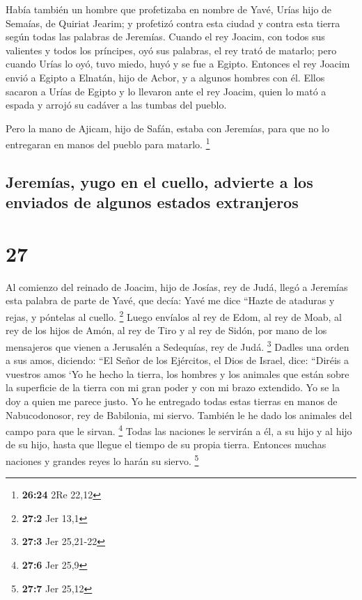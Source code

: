  Había también un hombre que profetizaba en nombre de
Yavé, Urías hijo de Semaías, de Quiriat Jearim; y profetizó contra esta
ciudad y contra esta tierra según todas las palabras de Jeremías.
 Cuando el rey Joacim, con todos sus valientes y todos
los príncipes, oyó sus palabras, el rey trató de matarlo; pero cuando
Urías lo oyó, tuvo miedo, huyó y se fue a Egipto. 
Entonces el rey Joacim envió a Egipto a Elnatán, hijo de Acbor, y a
algunos hombres con él.  Ellos sacaron a Urías de Egipto
y lo llevaron ante el rey Joacim, quien lo mató a espada y arrojó su
cadáver a las tumbas del pueblo.

 Pero la mano de Ajicam, hijo de Safán, estaba con
Jeremías, para que no lo entregaran en manos del pueblo para matarlo.
\footnote{\textbf{26:24} 2Re 22,12}

\hypertarget{jeremuxedas-yugo-en-el-cuello-advierte-a-los-enviados-de-algunos-estados-extranjeros}{%
\subsection{Jeremías, yugo en el cuello, advierte a los enviados de
algunos estados
extranjeros}\label{jeremuxedas-yugo-en-el-cuello-advierte-a-los-enviados-de-algunos-estados-extranjeros}}

\hypertarget{section-26}{%
\section{27}\label{section-26}}

 Al comienzo del reinado de Joacim, hijo de Josías, rey de
Judá, llegó a Jeremías esta palabra de parte de Yavé, que decía:
 Yavé me dice ``Hazte de ataduras y rejas, y póntelas al
cuello. \footnote{\textbf{27:2} Jer 13,1}  Luego envíalos
al rey de Edom, al rey de Moab, al rey de los hijos de Amón, al rey de
Tiro y al rey de Sidón, por mano de los mensajeros que vienen a
Jerusalén a Sedequías, rey de Judá. \footnote{\textbf{27:3} Jer 25,21-22}
 Dadles una orden a sus amos, diciendo: ``El Señor de los
Ejércitos, el Dios de Israel, dice: ``Diréis a vuestros amos
 `Yo he hecho la tierra, los hombres y los animales que
están sobre la superficie de la tierra con mi gran poder y con mi brazo
extendido. Yo se la doy a quien me parece justo.  Yo he
entregado todas estas tierras en manos de Nabucodonosor, rey de
Babilonia, mi siervo. También le he dado los animales del campo para que
le sirvan. \footnote{\textbf{27:6} Jer 25,9}  Todas las
naciones le servirán a él, a su hijo y al hijo de su hijo, hasta que
llegue el tiempo de su propia tierra. Entonces muchas naciones y grandes
reyes lo harán su siervo. \footnote{\textbf{27:7} Jer 25,12}

